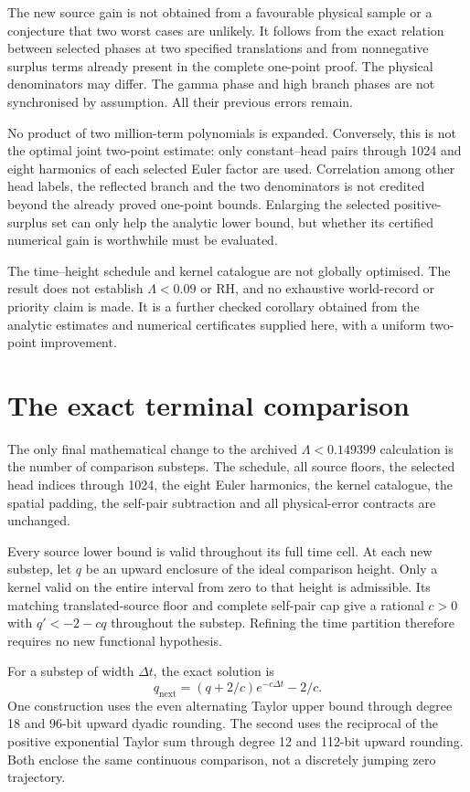 \documentclass[11pt,a4paper]{article}
\begin{document}
The new source gain is not obtained from a favourable physical sample or a
conjecture that two worst cases are unlikely. It follows from the exact
relation between selected phases at two specified translations and from
nonnegative surplus terms already present in the complete one-point proof.
The physical denominators may differ. The gamma phase and high branch phases
are not synchronised by assumption. All their previous errors remain.

No product of two million-term polynomials is expanded. Conversely, this is
not the optimal joint two-point estimate: only constant--head pairs through
1024 and eight harmonics of each selected Euler factor are used. Correlation
among other head labels, the reflected branch and the two denominators is
not credited beyond the already proved one-point bounds. Enlarging the
selected positive-surplus set can only help the analytic lower bound, but
whether its certified numerical gain is worthwhile must be evaluated.

The time--height schedule and kernel catalogue are not globally optimised.
The result does not establish \(\Lambda<0.09\) or RH, and no exhaustive
world-record or priority claim is made. It is a further checked corollary
obtained from the analytic estimates and numerical certificates supplied here, with a uniform two-point improvement.

\section{The exact terminal comparison}\label{final-publication-refinement-and-opportunity-audit}

The only final mathematical change to the archived \(\Lambda<0.149399\)
calculation is the number of comparison substeps. The schedule, all source
floors, the selected head indices through 1024, the eight Euler harmonics,
the kernel catalogue, the spatial padding, the self-pair subtraction and
all physical-error contracts are unchanged.

Every source lower bound is valid throughout its full time cell.
At each new substep, let \(q\) be an upward enclosure of the ideal comparison
height. Only a kernel valid on the entire interval from zero to that height
is admissible. Its matching translated-source floor and complete self-pair
cap give a rational \(c>0\) with \(q'<-2-cq\) throughout the substep.
Refining the time partition therefore requires no new functional hypothesis.

For a substep of width \(\Delta t\), the exact solution is
\[
q_{\mathrm{next}}=(q+2/c)e^{-c\Delta t}-2/c.
\]
One construction uses the even alternating Taylor upper bound through degree
18 and 96-bit upward dyadic rounding. The second uses the reciprocal of the
positive exponential Taylor sum through degree 12 and 112-bit upward rounding.
Both enclose the same continuous comparison, not a discretely jumping zero
trajectory.
\end{document}
